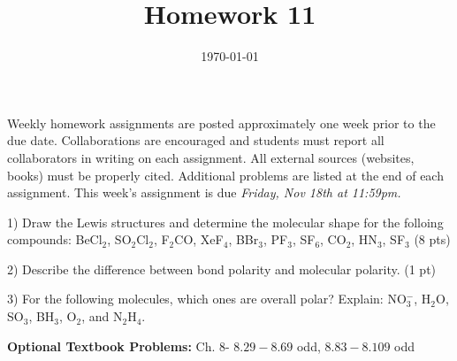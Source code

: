 \documentclass[12pt]{article}
\title{\textbf{Homework 11}}
\date{\vspace{-2em}\today}
\begin{document}
\maketitle 

Weekly homework assignments are posted approximately one week prior to the
due date. Collaborations are encouraged and students must report all collaborators
in writing on each assignment. All external sources (websites, books) must be
properly cited. Additional problems are listed at the end of each assignment.
This week's assignment is due \textit{Friday, Nov 18th at 11:59pm.}

1) Draw the Lewis structures and determine the molecular shape for the folloing
compounds: BeCl$_2$, SO$_2$Cl$_2$, F$_2$CO, XeF$_4$, BBr$_3$, PF$_3$, SF$_6$,
CO$_2$, HN$_3$, SF$_3$ (8 pts)
\vspace{2.3in}

2) Describe the difference between bond polarity and molecular polarity. (1 pt)
\vspace{1in}

3) For the following molecules, which ones are overall polar? Explain: NO$_3^-$,
H$_2$O, SO$_3$, BH$_3$, O$_2$, and N$_2$H$_4$.

\vfill

\textbf{Optional Textbook Problems:} Ch. 8- $8.29 - 8.69$ odd, $8.83 - 8.109$ odd
\end{document}
